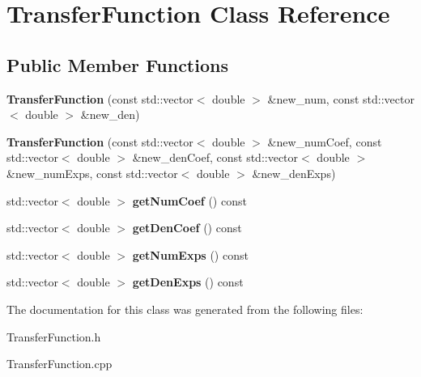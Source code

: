 \hypertarget{classTransferFunction}{}\section{Transfer\+Function Class Reference}
\label{classTransferFunction}
\subsection*{Public Member Functions}
\begin{DoxyCompactItemize}
\item 
\mbox{\label{classTransferFunction_ac9ae0fe51082390d213e27205f16880c}} 
{\bfseries Transfer\+Function} (const std\+::vector$<$ double $>$ \&new\+\_\+num, const std\+::vector$<$ double $>$ \&new\+\_\+den)
\item 
\mbox{\label{classTransferFunction_ae93bedeefe64d8679d757ef907914fbd}} 
{\bfseries Transfer\+Function} (const std\+::vector$<$ double $>$ \&new\+\_\+num\+Coef, const std\+::vector$<$ double $>$ \&new\+\_\+den\+Coef, const std\+::vector$<$ double $>$ \&new\+\_\+num\+Exps, const std\+::vector$<$ double $>$ \&new\+\_\+den\+Exps)
\item 
\mbox{\label{classTransferFunction_a1810e2b51714e9b3aa2e2e6cf08a6b00}} 
std\+::vector$<$ double $>$ {\bfseries get\+Num\+Coef} () const
\item 
\mbox{\label{classTransferFunction_a1f8928d9fb90420f6d63cef63fc14199}} 
std\+::vector$<$ double $>$ {\bfseries get\+Den\+Coef} () const
\item 
\mbox{\label{classTransferFunction_a49191b0dced44eae9bfef692323f147a}} 
std\+::vector$<$ double $>$ {\bfseries get\+Num\+Exps} () const
\item 
\mbox{\label{classTransferFunction_a8d202226c249d387acf0da7da2b31ecd}} 
std\+::vector$<$ double $>$ {\bfseries get\+Den\+Exps} () const
\end{DoxyCompactItemize}


The documentation for this class was generated from the following files\+:\begin{DoxyCompactItemize}
\item 
Transfer\+Function.\+h\item 
Transfer\+Function.\+cpp\end{DoxyCompactItemize}
